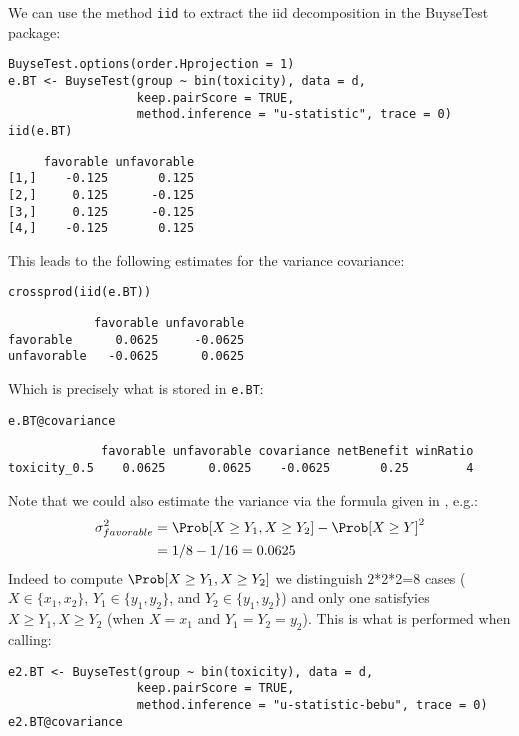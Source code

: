 \documentclass[12pt]{article}
\begin{document}
We can use the method \texttt{iid} to extract the iid decomposition in the
BuyseTest package:
\lstset{language=r,label= ,caption= ,captionpos=b,numbers=none}
\begin{lstlisting}
BuyseTest.options(order.Hprojection = 1)
e.BT <- BuyseTest(group ~ bin(toxicity), data = d, 
				  keep.pairScore = TRUE,
				  method.inference = "u-statistic", trace = 0)
iid(e.BT)
\end{lstlisting}

\begin{verbatim}
     favorable unfavorable
[1,]    -0.125       0.125
[2,]     0.125      -0.125
[3,]     0.125      -0.125
[4,]    -0.125       0.125
\end{verbatim}

This leads to the following estimates for the variance covariance:
\lstset{language=r,label= ,caption= ,captionpos=b,numbers=none}
\begin{lstlisting}
crossprod(iid(e.BT))
\end{lstlisting}

\begin{verbatim}
            favorable unfavorable
favorable      0.0625     -0.0625
unfavorable   -0.0625      0.0625
\end{verbatim}

Which is precisely what is stored in \texttt{e.BT}:
\lstset{language=r,label= ,caption= ,captionpos=b,numbers=none}
\begin{lstlisting}
e.BT@covariance
\end{lstlisting}

\begin{verbatim}
             favorable unfavorable covariance netBenefit winRatio
toxicity_0.5    0.0625      0.0625    -0.0625       0.25        4
\end{verbatim}

Note that we could also estimate the variance via the formula given in
\citep{bebu2015large}, e.g.:
\begin{align*}
\sigma^2_{favorable} &= \Prob[X \geq Y_1,X \geq Y_2] - \Prob[X \geq Y]^2 \\
&= 1/8 - 1/16 = 0.0625
\end{align*}
Indeed to compute \(\Prob[X \geq Y_1,X \geq Y_2]\) we distinguish
2*2*2=8 cases (\(X \in \{x_1,x_2\}\), \(Y_1 \in \{y_1,y_2\}\), and
\(Y_2 \in \{y_1,y_2\}\)) and only one satisfyies \(X \geq Y_1,X \geq
Y_2\) (when \(X=x_1\) and \(Y_1=Y_2=y_2\)). This is what is performed when calling:
\lstset{language=r,label= ,caption= ,captionpos=b,numbers=none}
\begin{lstlisting}
e2.BT <- BuyseTest(group ~ bin(toxicity), data = d, 
				  keep.pairScore = TRUE,
				  method.inference = "u-statistic-bebu", trace = 0)
e2.BT@covariance
\end{lstlisting}
\end{document}
